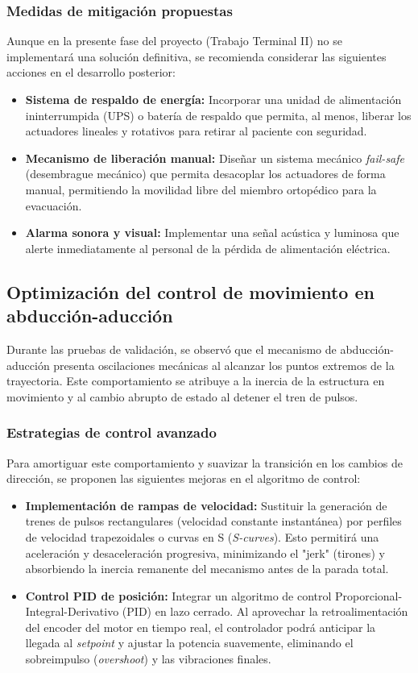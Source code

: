 \subsubsection*{Medidas de mitigación propuestas}
Aunque en la presente fase del proyecto (Trabajo Terminal II) no se implementará una solución definitiva, se recomienda considerar las siguientes acciones en el desarrollo posterior:
\begin{itemize}
	\item \textbf{Sistema de respaldo de energía:} Incorporar una unidad de alimentación ininterrumpida (UPS) o batería de respaldo que permita, al menos, liberar los actuadores lineales y rotativos para retirar al paciente con seguridad.
	\item \textbf{Mecanismo de liberación manual:} Diseñar un sistema mecánico \textit{fail-safe} (desembrague mecánico) que permita desacoplar los actuadores de forma manual, permitiendo la movilidad libre del miembro ortopédico para la evacuación.
	\item \textbf{Alarma sonora y visual:} Implementar una señal acústica y luminosa que alerte inmediatamente al personal de la pérdida de alimentación eléctrica.
\end{itemize}

\subsection*{Optimización del control de movimiento en abducción-aducción}
Durante las pruebas de validación, se observó que el mecanismo de abducción-aducción presenta oscilaciones mecánicas al alcanzar los puntos extremos de la trayectoria. Este comportamiento se atribuye a la inercia de la estructura en movimiento y al cambio abrupto de estado al detener el tren de pulsos.
\subsubsection*{Estrategias de control avanzado}
Para amortiguar este comportamiento y suavizar la transición en los cambios de dirección, se proponen las siguientes mejoras en el algoritmo de control:
\begin{itemize}
    \item \textbf{Implementación de rampas de velocidad:} Sustituir la generación de trenes de pulsos rectangulares (velocidad constante instantánea) por perfiles de velocidad trapezoidales o curvas en S (\textit{S-curves}). Esto permitirá una aceleración y desaceleración progresiva, minimizando el "jerk" (tirones) y absorbiendo la inercia remanente del mecanismo antes de la parada total.
    \item \textbf{Control PID de posición:} Integrar un algoritmo de control Proporcional-Integral-Derivativo (PID) en lazo cerrado. Al aprovechar la retroalimentación del encoder del motor en tiempo real, el controlador podrá anticipar la llegada al \textit{setpoint} y ajustar la potencia suavemente, eliminando el sobreimpulso (\textit{overshoot}) y las vibraciones finales.
\end{itemize}

